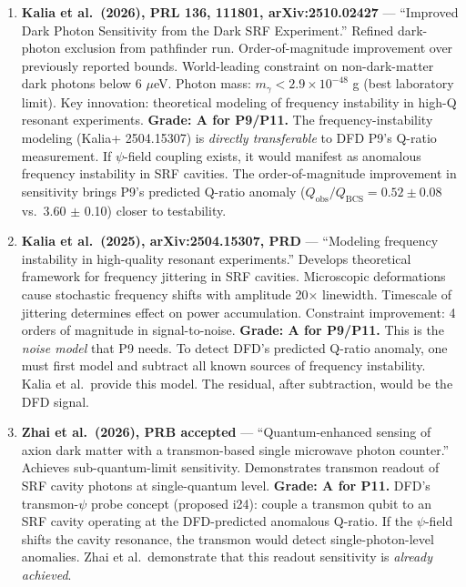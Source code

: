 \documentclass[11pt,a4paper]{article}
\begin{document}
\begin{enumerate}

\item \textbf{Kalia et al.\ (2026), PRL 136, 111801, arXiv:2510.02427} --- ``Improved Dark Photon Sensitivity from the Dark SRF Experiment.'' Refined dark-photon exclusion from pathfinder run. Order-of-magnitude improvement over previously reported bounds. World-leading constraint on non-dark-matter dark photons below 6 $\mu$eV. Photon mass: $m_\gamma < 2.9 \times 10^{-48}$ g (best laboratory limit). Key innovation: theoretical modeling of frequency instability in high-Q resonant experiments. \textbf{Grade: A for P9/P11.} The frequency-instability modeling (Kalia+ 2504.15307) is \emph{directly transferable} to DFD P9's Q-ratio measurement. If $\psi$-field coupling exists, it would manifest as anomalous frequency instability in SRF cavities. The order-of-magnitude improvement in sensitivity brings P9's predicted Q-ratio anomaly ($Q_\mathrm{obs}/Q_\mathrm{BCS} = 0.52 \pm 0.08$ vs.\ 3.60 $\pm$ 0.10) closer to testability.

\item \textbf{Kalia et al.\ (2025), arXiv:2504.15307, PRD} --- ``Modeling frequency instability in high-quality resonant experiments.'' Develops theoretical framework for frequency jittering in SRF cavities. Microscopic deformations cause stochastic frequency shifts with amplitude 20$\times$ linewidth. Timescale of jittering determines effect on power accumulation. Constraint improvement: 4 orders of magnitude in signal-to-noise. \textbf{Grade: A for P9/P11.} This is the \emph{noise model} that P9 needs. To detect DFD's predicted Q-ratio anomaly, one must first model and subtract all known sources of frequency instability. Kalia et al.\ provide this model. The residual, after subtraction, would be the DFD signal.

\item \textbf{Zhai et al.\ (2026), PRB accepted} --- ``Quantum-enhanced sensing of axion dark matter with a transmon-based single microwave photon counter.'' Achieves sub-quantum-limit sensitivity. Demonstrates transmon readout of SRF cavity photons at single-quantum level. \textbf{Grade: A for P11.} DFD's transmon-$\psi$ probe concept (proposed i24): couple a transmon qubit to an SRF cavity operating at the DFD-predicted anomalous Q-ratio. If the $\psi$-field shifts the cavity resonance, the transmon would detect single-photon-level anomalies. Zhai et al.\ demonstrate that this readout sensitivity is \emph{already achieved}.


\end{enumerate}
\end{document}

